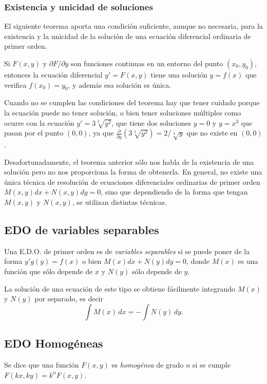\subsubsection*{Existencia y unicidad de soluciones}
El siguiente teorema aporta una condición suficiente, aunque no necesaria, para la existencia y la unicidad de la solución de una ecuación diferencial ordinaria de primer orden.

\begin{teoremasn}
Si $F(x,y)$ y $\partial F/\partial y$ son funciones continuas en un entorno del punto $(x_0,y_0)$, entonces la ecuación diferencial $y'=F(x,y)$ tiene una solución $y=f(x)$ que verifica $f(x_0)=y_0$, y además esa solución es única.
\end{teoremasn}
Cuando no se cumplen las condiciones del teorema hay que tener cuidado porque la ecuación puede no tener solución, o bien tener soluciones múltiples como ocurre con la ecuación $y'=3\sqrt[3]{y^2}$, que tiene dos soluciones $y=0$ y $y=x^3$ que pasan por el punto $(0,0)$, ya que $\frac{\partial}{\partial y}(3\sqrt[3]{y^2})=2/\sqrt[3]{y}$ que no existe en $(0,0)$.

Desafortunadamente, el teorema anterior sólo nos habla de la existencia de una solución pero no nos proporciona la forma de obtenerla. En general, no existe una única técnica de resolución de ecuaciones diferenciales ordinarias de primer orden $M(x,y)dx+N(x,y)dy=0$, sino que dependiendo de la forma que tengan $M(x,y)$ y $N(x,y)$, se utilizan distintas técnicas.

\subsection{EDO de variables separables}

Una E.D.O. de primer orden es de \emph{variables separables} si se
puede poner de la forma $y'g(y)=f(x)$ o bien $M(x)dx+N(y)dy=0$,
donde $M(x)$ es una función que sólo depende de $x$ y $N(y)$ sólo
depende de $y$.

La solución de una ecuación de este tipo se obtiene fácilmente integrando $M(x)$ y $N(y)$ por separado, es decir
\[
\int M(x)\,dx=-\int N(y)\,dy.
\]

\subsection{EDO Homogéneas}
Se dice que una función $F(x,y)$ es \emph{homogénea} de grado $n$ si se cumple $F(kx,ky)=k^nF(x,y)$.

